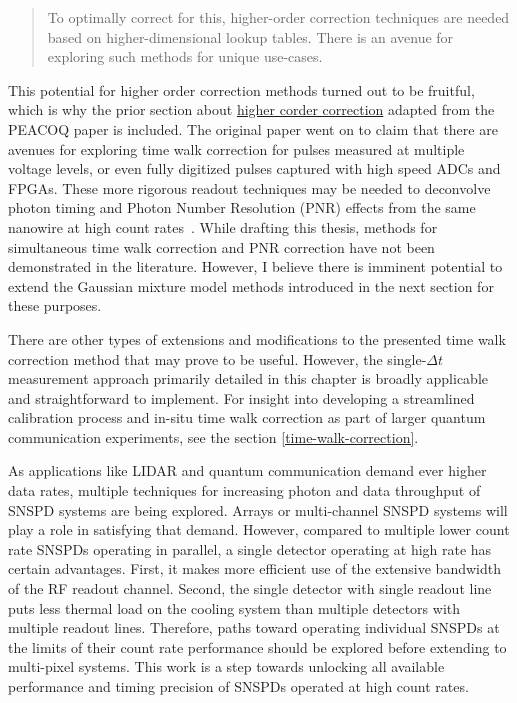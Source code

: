 \documentclass[11pt]{caltech_thesis} %
\begin{document}
\begin{quote}
To optimally correct for this, higher-order correction techniques are needed based on higher-dimensional lookup tables. There is an avenue for exploring such methods for unique use-cases. \autocite{Mueller2023}
\end{quote}

This potential for higher order correction methods turned out to be fruitful, which is why the prior section about \href{section_05_peacoq_2nd_order.md\#second-order-calibration}{higher corder correction} adapted from the PEACOQ paper \autocite{Craiciu23} is included. The original paper went on to claim that there are avenues for exploring time walk correction for pulses measured at multiple voltage levels, or even fully digitized pulses captured with high speed ADCs and FPGAs. These more rigorous readout techniques may be needed to deconvolve photon timing and Photon Number Resolution (PNR) effects from the same nanowire at high count rates~\autocite{Hao2021}. While drafting this thesis, methods for simultaneous time walk correction and PNR correction have not been demonstrated in the literature. However, I believe there is imminent potential to extend the Gaussian mixture model methods introduced in the next section for these purposes.

There are other types of extensions and modifications to the presented time walk correction method that may prove to be useful. However, the single-$\Delta t$ measurement approach primarily detailed in this chapter is broadly applicable and straightforward to implement. For insight into developing a streamlined calibration process and in-situ time walk correction as part of larger quantum communication experiments, see the section \ref{time-walk-correction}.

As applications like LIDAR and quantum communication demand ever higher data rates, multiple techniques for increasing photon and data throughput of SNSPD systems are being explored. Arrays or multi-channel SNSPD systems will play a role in satisfying that demand. However, compared to multiple lower count rate SNSPDs operating in parallel, a single detector operating at high rate has certain advantages. First, it makes more efficient use of the extensive bandwidth of the RF readout channel. Second, the single detector with single readout line puts less thermal load on the cooling system than multiple detectors with multiple readout lines. Therefore, paths toward operating individual SNSPDs at the limits of their count rate performance should be explored before extending to multi-pixel systems. This work is a step towards unlocking all available performance and timing precision of SNSPDs operated at high count rates.
\end{document}
